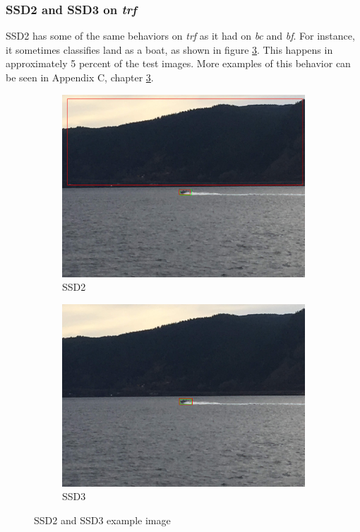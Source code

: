 \subsubsection{SSD2 and SSD3 on \textit{trf}}

SSD2 has some of the same behaviors on \textit{trf} as it had on \textit{bc} and \textit{bf}. For instance, it sometimes classifies land as a boat, as shown in figure \ref{fig:ssd_trf_bigbox}. This happens in approximately 5 percent of the test images. More examples of this behavior can be seen in Appendix C, chapter \ref{fig:ssd_trf_bigbox}.

\begin{figure}[h!]
\begin{subfigure}{.5\textwidth}
  \centering
  \includegraphics[width=0.8\linewidth]{results/case_buildings/ssdtrf/ssd2/grov2/IMG_2325.jpg}
  \caption{SSD2}
  \label{fig:ex_trf_prec_rec_yolo}
\end{subfigure}%
\begin{subfigure}{.5\textwidth}
  \centering
  \includegraphics[width=.8\linewidth]{results/case_buildings/ssdtrf/ssd3/grov2/IMG_2325.jpg}
  \caption{SSD3}
  \label{fig:ex_trf_prec_rec_ssd}
\end{subfigure}
\caption{SSD2 and SSD3 example image}
\label{fig:ssd_trf_bigbox}
\end{figure}

